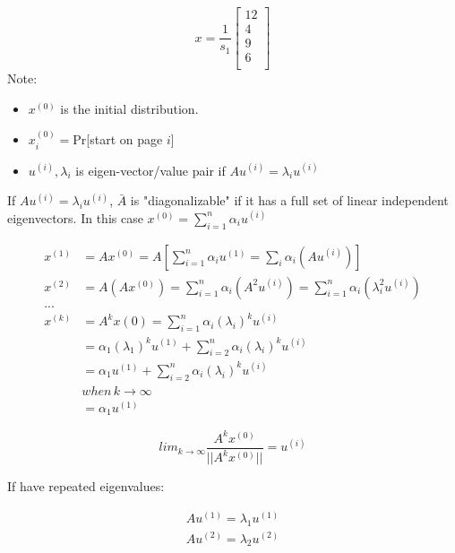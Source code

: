 $$
x = \frac{1}{s_1}
\left[
\begin{matrix}
12 \\
4 \\
9\\
6\\
\end{matrix}
\right]
$$
Note: 

\begin{itemize}
	\item $x^{(0)}$ is the initial distribution.
	
	\item $x^{(0)}_i = $Pr[start on page $i$]
	
	\item $u^{(i)}, \lambda_i$ is eigen-vector/value pair if $Au^{(i)} = \lambda_iu^{(i)}$
\end{itemize}


If $Au^{(i)} = \lambda_iu^{(i)}$, $\bar{A}$ is "diagonalizable" if it has a full set of linear independent eigenvectors. In this case $x^{(0)} = \sum^n_{i=1}\alpha_iu^{(i)}$

\begin{align*}
x^{(1)} &= Ax^{(0)} = A[\sum^n_{i=1}\alpha_iu^{(1)} = \sum_i\alpha_i(Au^{(i)})]\\
x^{(2)} &= A(Ax^{(0)}) = \sum^n_{i=1}\alpha_i(A^2u^{(i)}) = \sum^n_{i=1}\alpha_i(\lambda_i^2u^{(i)})\\
...\\
x^{(k)} &= A^kx{(0)} = \sum^n_{i=1}\alpha_i(\lambda_i)^ku^{(i)}\\
&= \alpha_1(\lambda_1)^ku^{(1)} + \sum^n_{i=2}\alpha_i(\lambda_i)^ku^{(i)} \\
&= \alpha_1u^{(1)} + \sum^n_{i=2}\alpha_i(\lambda_i)^ku^{(i)}\\
&when \,k \rightarrow \infty\\
&= \alpha_1u^{(1)}
\end{align*}

\begin{equation*}
lim_{k\rightarrow \infty}\frac{A^kx^{(0)}}{||A^kx^{(0)}||} =u^{(i)}
\end{equation*}


If have repeated eigenvalues:

\begin{align*}
Au^{(1)} =\lambda_1u^{(1)}\\
Au^{(2)} =\lambda_2u^{(2)}
\end{align*}

